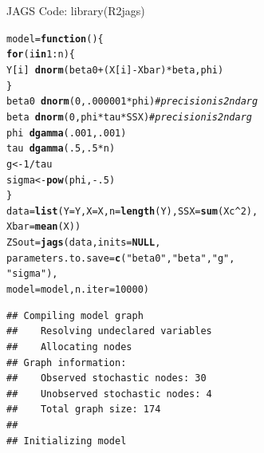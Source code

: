 \documentclass[]{beamer}\usepackage[]{graphicx}\usepackage[]{color}
\makeatletter
\newcommand{\hlnum}[1]{\textcolor[rgb]{0.686,0.059,0.569}{#1}}%
\newcommand{\hlstr}[1]{\textcolor[rgb]{0.192,0.494,0.8}{#1}}%
\newcommand{\hlcom}[1]{\textcolor[rgb]{0.678,0.584,0.686}{\textit{#1}}}%
\newcommand{\hlopt}[1]{\textcolor[rgb]{0,0,0}{#1}}%
\newcommand{\hlstd}[1]{\textcolor[rgb]{0.345,0.345,0.345}{#1}}%
\newcommand{\hlkwa}[1]{\textcolor[rgb]{0.161,0.373,0.58}{\textbf{#1}}}%
\newcommand{\hlkwb}[1]{\textcolor[rgb]{0.69,0.353,0.396}{#1}}%
\newcommand{\hlkwc}[1]{\textcolor[rgb]{0.333,0.667,0.333}{#1}}%
\newcommand{\hlkwd}[1]{\textcolor[rgb]{0.737,0.353,0.396}{\textbf{#1}}}%
\newenvironment{kframe}{%
 \def\at@end@of@kframe{}%
 \ifinner\ifhmode%
  \def\at@end@of@kframe{\end{minipage}}%
  \begin{minipage}{\columnwidth}%
 \fi\fi%
 \def\FrameCommand##1{\hskip\@totalleftmargin \hskip-\fboxsep
 \colorbox{shadecolor}{##1}\hskip-\fboxsep
     \hskip-\linewidth \hskip-\@totalleftmargin \hskip\columnwidth}%
 \MakeFramed {\advance\hsize-\width
   \@totalleftmargin\z@ \linewidth\hsize
   \@setminipage}}%
 {\par\unskip\endMakeFramed%
 \at@end@of@kframe}
\newenvironment{knitrout}{}{} %
\makeatother
\begin{document}
\begin{frame}[fragile]{JAGS Code: library(R2jags)}
\begin{knitrout}
\color{fgcolor}\begin{kframe}
\begin{alltt}
\hlstd{model} \hlkwb{=} \hlkwa{function}\hlstd{()\{}
  \hlkwa{for} \hlstd{(i} \hlkwa{in} \hlnum{1}\hlopt{:}\hlstd{n) \{}
      \hlstd{Y[i]} \hlopt{~} \hlkwd{dnorm}\hlstd{(beta0}\hlopt{+} \hlstd{(X[i]} \hlopt{-}\hlstd{Xbar)}\hlopt{*}\hlstd{beta, phi)}
  \hlstd{\}}
  \hlstd{beta0} \hlopt{~} \hlkwd{dnorm}\hlstd{(}\hlnum{0}\hlstd{,} \hlnum{.000001}\hlopt{*}\hlstd{phi)} \hlcom{#precision is 2nd arg}
  \hlstd{beta} \hlopt{~} \hlkwd{dnorm}\hlstd{(}\hlnum{0}\hlstd{, phi}\hlopt{*}\hlstd{tau}\hlopt{*}\hlstd{SSX)}  \hlcom{#precision is 2nd arg}
  \hlstd{phi} \hlopt{~} \hlkwd{dgamma}\hlstd{(}\hlnum{.001}\hlstd{,} \hlnum{.001}\hlstd{)}
  \hlstd{tau} \hlopt{~} \hlkwd{dgamma}\hlstd{(}\hlnum{.5}\hlstd{,} \hlnum{.5}\hlopt{*}\hlstd{n)}
  \hlstd{g} \hlkwb{<-} \hlnum{1}\hlopt{/}\hlstd{tau}
  \hlstd{sigma} \hlkwb{<-} \hlkwd{pow}\hlstd{(phi,} \hlopt{-}\hlnum{.5}\hlstd{)}
\hlstd{\}}
\hlstd{data} \hlkwb{=} \hlkwd{list}\hlstd{(}\hlkwc{Y}\hlstd{=Y,} \hlkwc{X}\hlstd{=X,} \hlkwc{n} \hlstd{=}\hlkwd{length}\hlstd{(Y),} \hlkwc{SSX}\hlstd{=}\hlkwd{sum}\hlstd{(Xc}\hlopt{^}\hlnum{2}\hlstd{),}
            \hlkwc{Xbar}\hlstd{=}\hlkwd{mean}\hlstd{(X))}
\hlstd{ZSout} \hlkwb{=} \hlkwd{jags}\hlstd{(data,} \hlkwc{inits}\hlstd{=}\hlkwa{NULL}\hlstd{,}
             \hlkwc{parameters.to.save}\hlstd{=}\hlkwd{c}\hlstd{(}\hlstr{"beta0"}\hlstd{,}\hlstr{"beta"}\hlstd{,} \hlstr{"g"}\hlstd{,}
                                  \hlstr{"sigma"}\hlstd{),}
             \hlkwc{model}\hlstd{=model,} \hlkwc{n.iter}\hlstd{=}\hlnum{10000}\hlstd{)}
\end{alltt}


{\ttfamily\noindent\itshape\color{messagecolor}{\#\# module glm loaded}}\begin{verbatim}
## Compiling model graph
##    Resolving undeclared variables
##    Allocating nodes
## Graph information:
##    Observed stochastic nodes: 30
##    Unobserved stochastic nodes: 4
##    Total graph size: 174
## 
## Initializing model
\end{verbatim}
\end{kframe}
\end{knitrout}
\end{frame}
\end{document}
